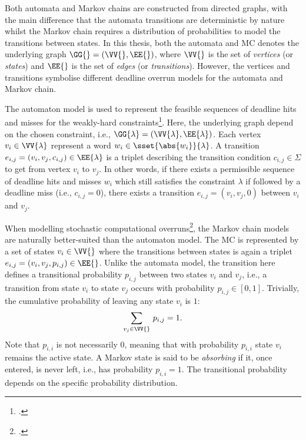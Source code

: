 Both automata and Markov chains are constructed from directed graphs, with the main difference that the automata transitions are deterministic by nature whilst the Markov chain requires a distribution of probabilities to model the transitions between states.
In this thesis, both the automata and MC denotes the underlying graph $\GG{} = (\VV{}, \EE{})$, where $\VV{}$ is the set of \emph{vertices} (or \emph{states}) and $\EE{}$ is the set of \emph{edges} (or \emph{transitions}).
However, the vertices and transitions symbolise different deadline overrun models for the automata and Markov chain.

The automaton model is used to represent the feasible sequences of deadline hits and misses for the weakly-hard constraints\footnote{.}.
Here, the underlying graph depend on the chosen constraint, i.e., $\GG{\lambda} = (\VV{\lambda}, \EE{\lambda})$.
Each vertex $v_i \in \VV{\lambda}$ represent a word $w_i \in \sset{\abs{w_i}}{\lambda}$.
A transition $e_{i, j} = (v_i, v_j, c_{i,j}) \in \EE{\lambda}$ is a triplet describing the transition condition $c_{i,j} \in \Sigma$ to get from vertex $v_i$ to $v_j$.
In other words, if there exists a permissible sequence of deadline hits and misses $w_i$ which still satisfies the constraint $\lambda$ if followed by a deadline miss (i.e., $c_{i,j} = 0$), there exists a transition $e_{i,j} = (v_i, v_j, 0)$ between $v_i$ and $v_j$.

When modelling stochastic computational overruns\footnote{.}, the Markov chain models are naturally better-suited than the automaton model.
The MC is represented by a set of states $v_i \in \VV{}$ where the transitions between states is again a triplet $e_{i, j} = (v_i, v_j, p_{i, j}) \in \EE{}$.
Unlike the automata model, the transition here defines a transitional probability $p_{i, j}$ between two states $v_i$ and $v_j$, i.e., a transition from state $v_i$ to state $v_j$ occurs with probability $p_{i, j} \in [0, 1]$.
Trivially, the cumulative probability of leaving any state $v_i$ is $1$:
%
\begin{equation}
    \sum_{v_j\in\VV{}}\, p_{i, j} = 1.
\end{equation}
%
Note that $p_{i, i}$ is not necessarily $0$, meaning that with probability $p_{i, i}$ state $v_i$ remains the active state.
A Markov state is said to be \emph{absorbing} if it, once entered, is never left, i.e., has probability $p_{i, i} = 1$.
The transitional probability depends on the specific probability distribution.

